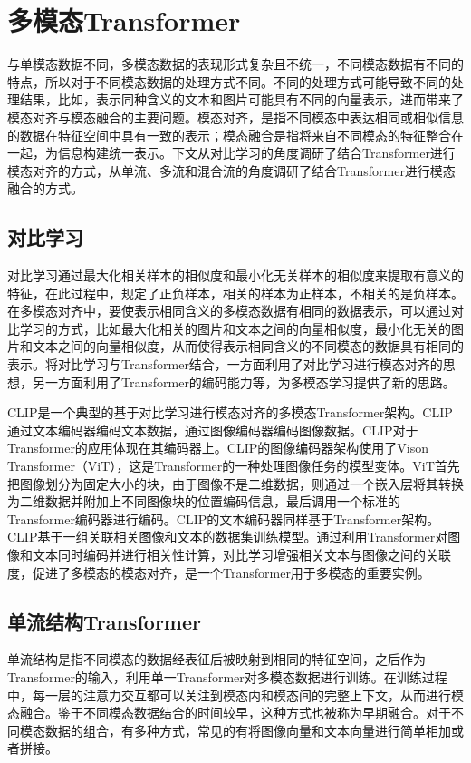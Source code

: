 \documentclass[journal]{IEEEtran}
\begin{document}
\section{多模态Transformer}\label{fusion}
与单模态数据不同，多模态数据的表现形式复杂且不统一，不同模态数据有不同的特点，所以对于不同模态数据的处理方式不同。不同的处理方式可能导致不同的处理结果，比如，表示同种含义的文本和图片可能具有不同的向量表示，进而带来了模态对齐与模态融合的主要问题。模态对齐，是指不同模态中表达相同或相似信息的数据在特征空间中具有一致的表示；模态融合是指将来自不同模态的特征整合在一起，为信息构建统一表示。下文从对比学习的角度调研了结合Transformer进行模态对齐的方式，从单流、多流和混合流的角度调研了结合Transformer进行模态融合的方式。

\subsection{对比学习}
对比学习通过最大化相关样本的相似度和最小化无关样本的相似度来提取有意义的特征，在此过程中，规定了正负样本，相关的样本为正样本，不相关的是负样本。在多模态对齐中，要使表示相同含义的多模态数据有相同的数据表示，可以通过对比学习的方式，比如最大化相关的图片和文本之间的向量相似度，最小化无关的图片和文本之间的向量相似度，从而使得表示相同含义的不同模态的数据具有相同的表示。将对比学习与Transformer结合，一方面利用了对比学习进行模态对齐的思想，另一方面利用了Transformer的编码能力等，为多模态学习提供了新的思路。

CLIP\cite{radford2021learning}是一个典型的基于对比学习进行模态对齐的多模态Transformer架构。CLIP通过文本编码器编码文本数据，通过图像编码器编码图像数据。CLIP对于Transformer的应用体现在其编码器上。CLIP的图像编码器架构使用了Vison Transformer（ViT）\cite{dosovitskiy2020image}，这是Transformer的一种处理图像任务的模型变体。ViT首先把图像划分为固定大小的块，由于图像不是二维数据，则通过一个嵌入层将其转换为二维数据并附加上不同图像块的位置编码信息，最后调用一个标准的Transformer编码器进行编码。CLIP的文本编码器同样基于Transformer架构。CLIP基于一组关联相关图像和文本的数据集训练模型。通过利用Transformer对图像和文本同时编码并进行相关性计算，对比学习增强相关文本与图像之间的关联度，促进了多模态的模态对齐，是一个Transformer用于多模态的重要实例。

\subsection{单流结构Transformer}
单流结构是指不同模态的数据经表征后被映射到相同的特征空间，之后作为Transformer的输入，利用单一Transformer对多模态数据进行训练。在训练过程中，每一层的注意力交互都可以关注到模态内和模态间的完整上下文，从而进行模态融合。鉴于不同模态数据结合的时间较早，这种方式也被称为早期融合。\cite{10123038}对于不同模态数据的组合，有多种方式，常见的有将图像向量和文本向量进行简单相加或者拼接。
\end{document}

